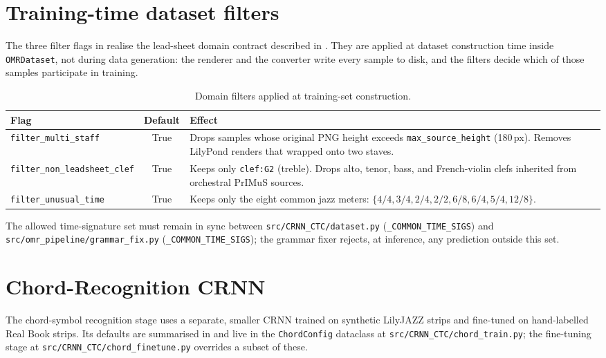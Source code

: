\section{Training-time dataset filters}

The three filter flags in  realise the lead-sheet domain contract described in . They are applied at dataset construction time inside \texttt{OMRDataset}, not during data generation: the renderer and the converter write every sample to disk, and the filters decide which of those samples participate in training.

\begin{table}[H]
\centering\small
\setlength{\tabcolsep}{5pt}
\renewcommand{\arraystretch}{1.30}
\begin{tabularx}{\textwidth}{@{} l c L @{}}
\toprule
\textbf{Flag} & \textbf{Default} & \textbf{Effect} \\
\midrule
\texttt{filter\_multi\_staff}         & True & Drops samples whose original PNG height exceeds \texttt{max\_source\_height} (180\,px). Removes LilyPond renders that wrapped onto two staves. \\
\texttt{filter\_non\_leadsheet\_clef} & True & Keeps only \texttt{clef:G2} (treble). Drops alto, tenor, bass, and French-violin clefs inherited from orchestral PrIMuS sources. \\
\texttt{filter\_unusual\_time}        & True & Keeps only the eight common jazz meters: $\{4/4, 3/4, 2/4, 2/2, 6/8, 6/4, 5/4, 12/8\}$. \\
\bottomrule
\end{tabularx}
\caption{Domain filters applied at training-set construction.}
\label{tab:filters}
\end{table}

The allowed time-signature set must remain in sync between \texttt{src/CRNN\_CTC/dataset.py} (\texttt{\_COMMON\_TIME\_SIGS}) and \texttt{src/omr\_pipeline/grammar\_fix.py} (\texttt{\_COMMON\_TIME\_SIGS}); the grammar fixer rejects, at inference, any prediction outside this set.

\section{Chord-Recognition CRNN}

The chord-symbol recognition stage uses a separate, smaller CRNN trained on synthetic LilyJAZZ strips and fine-tuned on hand-labelled Real Book strips. Its defaults are summarised in  and live in the \texttt{ChordConfig} dataclass at \texttt{src/CRNN\_CTC/chord\_train.py}; the fine-tuning stage at \texttt{src/CRNN\_CTC/chord\_finetune.py} overrides a subset of these.

